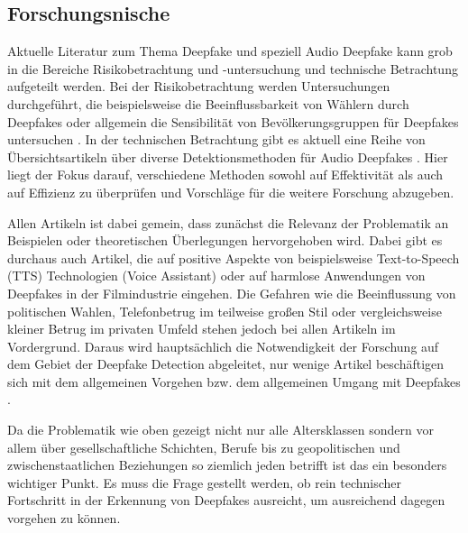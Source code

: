 \subsection{Forschungsnische}
Aktuelle Literatur zum Thema Deepfake und speziell Audio Deepfake kann grob in die Bereiche Risikobetrachtung und -untersuchung und technische Betrachtung aufgeteilt werden.
Bei der Risikobetrachtung werden Untersuchungen durchgeführt, die beispielsweise die Beeinflussbarkeit von Wählern durch Deepfakes  \citep[vgl.][]{Dobber2020} oder allgemein die Sensibilität von Bevölkerungsgruppen für Deepfakes untersuchen \citep[vgl.][]{Mueller2022}.
In der technischen Betrachtung gibt es aktuell eine Reihe von Übersichtsartikeln über diverse Detektionsmethoden für Audio Deepfakes \citep[vgl.][]{Masood2022,Khanjani2021,Almutairi2022}.
Hier liegt der Fokus darauf, verschiedene Methoden sowohl auf Effektivität als auch auf Effizienz zu überprüfen und Vorschläge für die weitere Forschung abzugeben.

Allen Artikeln ist dabei gemein, dass zunächst die Relevanz der Problematik an Beispielen oder theoretischen Überlegungen hervorgehoben wird.
Dabei gibt es durchaus auch Artikel, die auf positive Aspekte von beispielsweise Text-to-Speech (TTS) Technologien (Voice Assistant) oder auf harmlose Anwendungen von Deepfakes in der Filmindustrie eingehen.
Die Gefahren wie die Beeinflussung von politischen Wahlen, Telefonbetrug im teilweise großen Stil \citep[vgl.][]{} oder vergleichsweise kleiner Betrug im privaten Umfeld \citep[][]{} stehen jedoch bei allen Artikeln im Vordergrund.
Daraus wird hauptsächlich die Notwendigkeit der Forschung auf dem Gebiet der Deepfake Detection abgeleitet, nur wenige Artikel beschäftigen sich mit dem allgemeinen Vorgehen bzw. dem allgemeinen Umgang mit Deepfakes \citep[][]{}.

Da die Problematik wie oben gezeigt nicht nur alle Altersklassen sondern vor allem über gesellschaftliche Schichten, Berufe bis zu geopolitischen und zwischenstaatlichen Beziehungen so ziemlich jeden betrifft ist das ein besonders wichtiger Punkt.
Es muss die Frage gestellt werden, ob rein technischer Fortschritt in der Erkennung von Deepfakes ausreicht, um ausreichend dagegen vorgehen zu können.